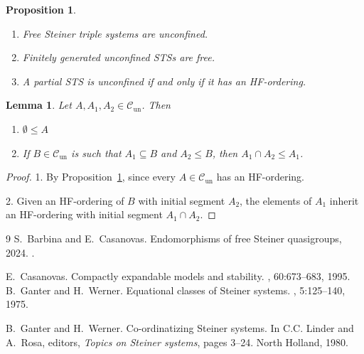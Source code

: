 \documentclass[10pt,a4paper]{article}
\newcommand{\Cun}{\mathcal{C}_\mathrm{un}}
\theoremstyle{note}
\newtheorem{lemma}[thm]{Lemma}
\newtheorem{prop}[thm]{Proposition}
\begin{document}
	\begin{prop}\label{unconfined} \begin{enumerate}
			\item Free Steiner triple systems are unconfined.
			\item Finitely generated unconfined STSs are free.
			\item A partial STS is unconfined if and only if it has an HF-ordering.
		\end{enumerate}
	\end{prop}

\begin{lemma}\label{diamond} Let $A,A_1,A_2 \in \Cun$. Then
	\begin{enumerate}
		\item $\emptyset \leq A$  
	\item If $B\in \Cun$ is such that $A_1\subseteq B$ and $A_2\leq B$, then $A_1\cap A_2\leq A_1$.
	\end{enumerate}
\end{lemma}

\begin{proof} 1. By Proposition~\ref{unconfined},  since every $A\in \Cun$ has an HF-ordering.
	
	2. Given an HF-ordering of $B$ with initial segment $A_2$, the elements of $A_1$ inherit an HF-ordering with initial segment $A_1\cap A_2$.
\end{proof}

\begin{thebibliography}{9}
S.~Barbina and E.~Casanovas.
\newblock Endomorphisms of free {S}teiner quasigroups, 2024.
.

E.~Casanovas.
\newblock Compactly expandable models and stability.
, 60:673--683, 1995.
B.~Ganter and H.~Werner.
\newblock Equational classes of {S}teiner systems.
, 5:125--140, 1975.

B.~Ganter and H.~Werner.
\newblock Co-ordinatizing {S}teiner systems.
\newblock In C.C. Linder and A.~Rosa, editors, {\em Topics on {S}teiner
  systems}, pages 3--24. North Holland, 1980.
\end{thebibliography}
\end{document}
